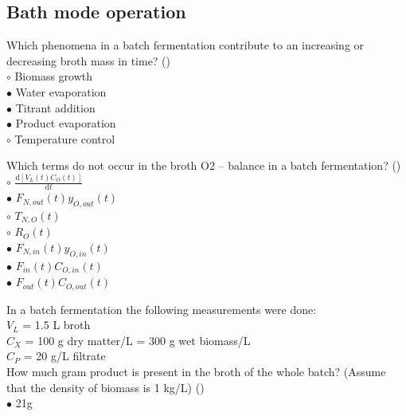 \documentclass[]{beamer}
\begin{document}
\subsection{Bath mode operation}
\setcounter{answers}{0}
\begin{frame}[shrink] {}
\addtocounter{answers}{1}
\color{blue}
Which phenomena in a batch fermentation contribute to an increasing or decreasing broth mass in time? ()\\
\color{black}
\setlength{\parindent}{-0.4cm}
{\color{red}$\circ$}  Biomass growth \\
{\color{red}$\bullet$} Water evaporation \\
{\color{red}$\bullet$} Titrant addition \\
{\color{red}$\bullet$} Product evaporation \\
{\color{red}$\circ$} Temperature control  \\
\end{frame}

\begin{frame}[shrink] {}
\addtocounter{answers}{1}
\color{blue}
Which terms do not occur in the broth O2 – balance in a batch fermentation? ()\\
\color{black}
\setlength{\parindent}{-0.4cm}
{\color{red}$\circ$} $\frac{\mathrm d [V_{L}(t)C_O(t)]}{\mathrm dt}$ \\[0.3em]
{\color{red}$\bullet$} $F_{N,out}(t) y_{O,out}(t)$ \\
{\color{red}$\circ$} $T_{N,O} (t)$ \\
{\color{red}$\circ$} $R_O (t)$ \\
{\color{red}$\bullet$} $F_{N,in}(t) y_{O,in}(t)$ \\
{\color{red}$\bullet$} $F_{in}(t) C_{O,in}(t)$ \\
{\color{red}$\bullet$} $F_{out}(t) C_{O,out}(t)$ \\
\end{frame}

\begin{frame}[shrink] {}
\addtocounter{answers}{1}
\color{blue}
In a batch fermentation the following measurements were done: \\
\color{gray}
$V_L$ = 1.5 L broth  \\
$C_X$ = 100 g dry matter/L = 300 g wet biomass/L \\
$C_P$ = 20 g/L filtrate \\
\color{blue}
How much gram product is present in the broth of the whole batch? 
(Assume that the density of biomass is 1 kg/L) ()\\
\color{black}
{\color{red}$\bullet$} 21g \\
\end{frame}
\end{document}
